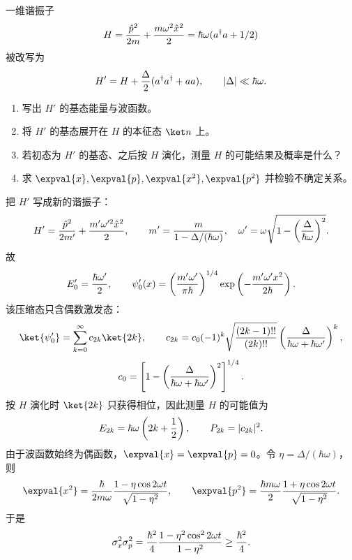 \begin{question}
一维谐振子
\[
  H={\hat p^2\over2m}+{m\omega^2\hat x^2\over2}
  =\hbar\omega(a^\dagger a+1/2)
\]
被改写为
\[
  H'=H+{\Delta\over2}(a^\dagger a^\dagger+aa),\qquad |\Delta|\ll \hbar\omega .
\]
\begin{enumerate}
  \item 写出 $H'$ 的基态能量与波函数。
  \item 将 $H'$ 的基态展开在 $H$ 的本征态 $\ket n$ 上。
  \item 若初态为 $H'$ 的基态、之后按 $H$ 演化，测量 $H$ 的可能结果及概率是什么？
  \item 求 $\expval{x},\expval{p},\expval{x^2},\expval{p^2}$ 并检验不确定关系。
\end{enumerate}
\begin{solution}
把 $H'$ 写成新的谐振子：
\[
  H'={\hat p^2\over2m'}+{m'\omega'^2\hat x^2\over2},\qquad
  m'={m\over1-\Delta/(\hbar\omega)},\quad
  \omega'=\omega\sqrt{1-\left({\Delta\over\hbar\omega}\right)^2}.
\]
故
\[
  E'_0={\hbar\omega'\over2},\qquad
  \psi'_0(x)=\left({m'\omega'\over\pi\hbar}\right)^{1/4}
  \exp\left(-{m'\omega' x^2\over2\hbar}\right).
\]
该压缩态只含偶数激发态：
\[
  \ket{\psi'_0}=\sum_{k=0}^\infty c_{2k}\ket{2k},\qquad c_{2k}
  =c_0(-1)^k\sqrt{(2k-1)!!\over(2k)!!}
  \left({\Delta\over\hbar\omega+\hbar\omega'}\right)^k,
\]
\[
  c_0=\left[1-\left({\Delta\over\hbar\omega+\hbar\omega'}\right)^2\right]^{1/4}.
\]
按 $H$ 演化时 $\ket{2k}$ 只获得相位，因此测量 $H$ 的可能值为
\[
  E_{2k}=\hbar\omega\left(2k+{1\over2}\right),
  \qquad P_{2k}=|c_{2k}|^2 .
\]
由于波函数始终为偶函数，$\expval{x}=\expval{p}=0$。令 $\eta=\Delta/(\hbar\omega)$，则
\[
  \expval{x^2}={\hbar\over2m\omega}{1-\eta\cos2\omega t\over\sqrt{1-\eta^2}},
  \qquad
  \expval{p^2}={\hbar m\omega\over2}{1+\eta\cos2\omega t\over\sqrt{1-\eta^2}}.
\]
于是
\[
  \sigma_x^2\sigma_p^2={\hbar^2\over4}{1-\eta^2\cos^2 2\omega t\over1-\eta^2}\ge{\hbar^2\over4}.
\]
\end{solution}
\end{question}
